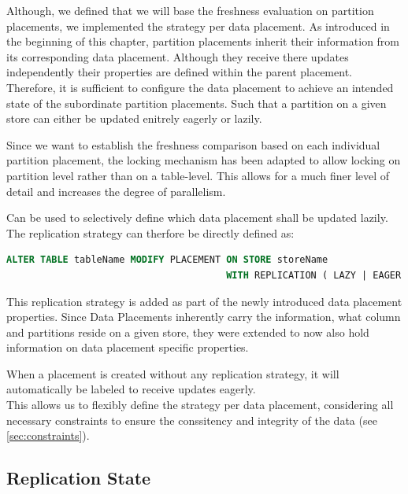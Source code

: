 Although, we defined that we will base the freshness evaluation on partition placements, we implemented the strategy per data placement. 
As introduced in the beginning of this chapter, partition placements inherit their information from its corresponding data placement.
Although they receive there updates independently their properties are defined within the parent placement. 
Therefore, it is sufficient to configure the data placement to achieve an intended state of the subordinate partition placements.
Such that a partition on a given store can either be updated enitrely eagerly or lazily. 


Since we want to establish the freshness comparison based on each individual partition placement, the locking mechanism
has been adapted to allow locking on partition level rather than on a table-level. 
This allows for a much finer level of detail and increases the degree of parallelism. 

Can be used to selectively define which data placement shall be updated lazily.
The replication strategy can therfore be directly defined as:
\begin{lstlisting}[language=sql, caption={SQL Stateemnt Syntax to modify the designated Replication Strategy for a Data Placement},label={lst:strategy}]
ALTER TABLE tableName MODIFY PLACEMENT ON STORE storeName 
                                       WITH REPLICATION ( LAZY | EAGER );
\end{lstlisting}

This replication strategy is added as part of the newly introduced data placement properties. Since Data Placements inherently carry the information, what column and partitions reside
on a given store, they were extended to now also hold information on data placement specific properties.

When a placement is created without any replication strategy, it will automatically be labeled to receive updates eagerly.\\
This allows us to flexibly define the strategy per data placement, considering all necessary constraints to ensure the conssitency and integrity of the data (see \ref{sec:constraints}).




\subsection{Replication State}
\label{sec:states}

